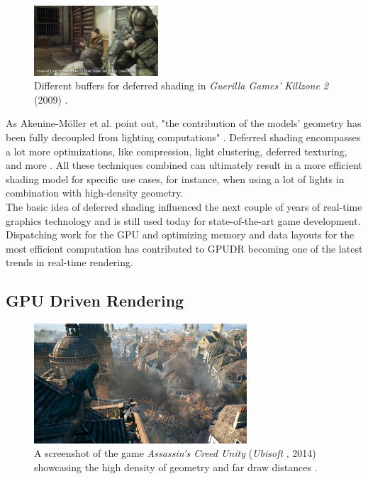 \begin{figure}[!]
    \includegraphics[width=175px]{images/graphics/killzone-2-buffer-post.jpg}
    \caption{Different buffers for deferred shading in \emph{Guerilla Games'} \emph{Killzone 2} (2009) 
    \cite{Valient2007}.}
    \label{fig:deferred-shading-buffers}
\end{figure}

\noindent
As Akenine-Möller et al. point out, "the contribution of the models’ geometry has been fully decoupled from lighting 
computations" \cite{AkenineMoeller2018}. Deferred shading encompasses a lot more optimizations, like compression, 
light clustering, deferred texturing, and more \cite{AkenineMoeller2018}. All these techniques combined can ultimately 
result in a more efficient shading model for specific use cases, for instance, when using a lot of lights in combination 
with high-density geometry.\\

\noindent
The basic idea of deferred shading influenced the next couple of years of real-time graphics technology and is 
still used today for state-of-the-art game development. Dispatching work for the \ac{GPU} and optimizing memory and 
data layouts for the most efficient computation has contributed to \ac{GPUDR} becoming one of the latest trends in real-time 
rendering.


\subsection*{GPU Driven Rendering}

\begin{figure}[h]
    \centering
    \includegraphics[width=300px]{images/graphics/assassins-creed-unity-gameplay.jpg}
    \caption{A screenshot of the game \emph{Assassin's Creed Unity} (\emph{Ubisoft} \cite{Ubisoft2014}, 2014) 
    showcasing the high density of geometry and far draw distances \cite{Burke2014}.}
    \label{fig:assassins-creed-unity-gameplay}
\end{figure}

